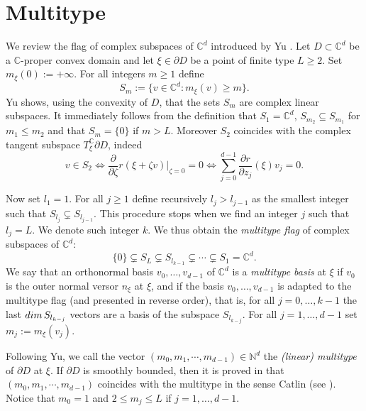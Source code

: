 \documentclass[11pt, reqno]{amsart}
\numberwithin{equation}{section}
\theoremstyle{definition}
\newcommand{\C}{\mathbb{C}}
\newcommand{\N}{\mathbb{N}}
\begin{document}
{		\endproof 
		
		
		
		
		
		
		
		\section{Multitype}
		
		We review the flag of complex subspaces of $\C^d$ introduced by Yu \cite{Yu}.
		Let $D\subset \C^d$ be a $\C$-proper convex domain and let $\xi\in \partial D$ be a point of finite type $L\geq 2$. Set $m_\xi(0):=+\infty$.
		For all integers $m\geq1$ define
		$$S_m:=\{v\in\C^d:m_\xi(v)\geq m\}.$$
		Yu shows, using the convexity of $D$, that the sets $S_m$ are complex linear subspaces.
		It immediately follows from the definition that $S_1=\C^d$,  $S_{m_2}\subseteq S_{m_1}$ for $m_1\leq m_2$ and that $S_{m}=\{0\}$ if $m>L$. Moreover $S_2$ coincides with the complex tangent subspace $T_\xi^\C\partial D$, indeed
		$$v\in S_2\iff \frac{\partial}{\partial \zeta}r(\xi+\zeta v)|_{\zeta=0}=0\iff \sum_{j=0}^{d-1}\frac{\partial r}{\partial z_j}(\xi)v_j=0.$$
		
		
		Now set $l_1=1$. For all $j\geq 1$  define recursively $l_{j}>l_{j-1}$ as the smallest integer such that $S_{l_{j}}\subsetneq S_{l_{j-1}}$. This procedure stops when we find an integer $j$ such that 
		$l_{j}=L$. We denote such integer $k$.
		We thus obtain the {\sl multitype  flag} of complex subspaces of $\C^d$:
		$$\{0\}\subsetneq S_L\subsetneq S_{l_{k-1}}\subsetneq\cdots\subsetneq S_{1}=\C^d.$$
		We say that  an orthonormal basis $v_0,\dots ,v_{d-1}$ of $\C^d$ is  a {\sl multitype basis} at $\xi$ if
		$v_0$ is the outer normal versor $n_\xi$ at $\xi$, and if the basis $v_0,\dots ,v_{d-1}$
		is adapted to  the multitype  flag (and presented in reverse order),  that is,
		for all  $j=0,\dots, k-1$ the last ${\rm dim}\, S_{l_{k-j}}$ vectors  are a basis of the subspace  $S_{l_{k-j}}$.
		For all $j=1,\dots , d-1$ set  $m_j:=m_\xi(v_j)$. 
		
		Following Yu, we call the vector  $(m_0,m_1,\cdots,m_{d-1})\in \N^d$ the {\sl (linear) multitype}  of $\partial D$ at $\xi$. If $\partial D$ is smoothly bounded, then it is proved in \cite{Yu} that $(m_0,m_1,\cdots,m_{d-1})$ coincides with the multitype in the sense  Catlin (see \cite{Cat}). Notice that $m_0=1$ and $2\leq m_j\leq L$ if $j=1,\dots,d-1$.
		
		
		
		
		
}
\end{document}
